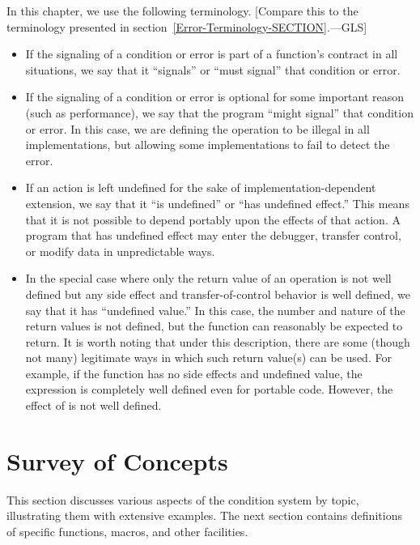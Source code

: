 In this chapter, we use the following terminology.
[Compare this to the terminology presented
in section~\ref{Error-Terminology-SECTION}.---GLS]
\begin{itemize}
\item
   If the signaling of a condition or error is part of a function's contract
   in all situations, we say that it ``signals'' or ``must signal'' that
   condition or error.

\item
   If the signaling of a condition or error is optional for some important
   reason (such as performance), we say that the program ``might signal''
   that condition or error. In this case, we are defining the operation to be
   illegal in all implementations, but allowing some implementations to fail to
   detect the error.

\item
   If an action is left undefined for the sake of implementation-dependent
   extension, we say that it ``is undefined'' or ``has undefined effect.''
   This means that it is not possible to depend portably upon the effects of
   that action. A program that has undefined effect may enter the debugger,
   transfer control, or modify data in unpredictable ways.

\item
   In the special case where only the return value of an operation is not
   well defined but any side effect and transfer-of-control behavior is
   well defined, we say that it has ``undefined value.'' In this case,
   the number and nature of the return values is not defined, but the
   function can reasonably be expected to return. It is worth noting that
   under this description, there are some (though not many) legitimate ways
   in which such return value(s) can be used. For example, if the function
    has no side effects and undefined value, the expression 
    is completely well defined even for portable code.
   However, the effect of  is not well defined.
\end{itemize}


\section{Survey of Concepts}

This section discusses various aspects of the condition system by topic,
illustrating them with extensive examples.  The next section contains
definitions of specific functions, macros, and other facilities.

